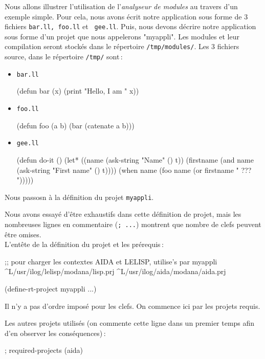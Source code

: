 
Nous allons illustrer l'utilisation de l'{\it analyseur de modules} au
travers d'un exemple simple. Pour cela, nous avons \'{e}crit notre
application sous forme de 3 fichiers {\tt bar.ll, foo.ll} et {\tt
gee.ll}. Puis, nous devons d\'{e}crire notre application sous forme d'un
projet que nous appelerons "myappli". Les modules et leur
compilation seront stock\'{e}s dans le
r\'{e}pertoire {\tt /tmp/modules/}.
Les 3 fichiers source, dans le r\'{e}pertoire {\tt /tmp/} sont\,:
\begin{itemize}
\item {\tt bar.ll}
\begin{Code*}
(defun bar (x) 
  (print "Hello, I am " x))
\end{Code*}
\item {\tt foo.ll}
\begin{Code*}
(defun foo (a b)
   (bar (catenate a b)))
\end{Code*}
\item {\tt gee.ll}
\begin{Code*}
(defun do-it ()
   (let* ((name (ask-string "Name" () t))
          (firstname (and name (ask-string "First name" () t))))
     (when name
           (foo name (or firstname " ??? ")))))
\end{Code*}
\end{itemize}
Nous passosn \`{a} la d\'{e}finition du projet {\tt myappli}. 

Nous avons essay\'{e} d'\^{e}tre
exhaustifs dans cette d\'{e}finition de projet, mais les nombreuses lignes
en commentaire ({\tt ; ...}) montrent que nombre de clefs peuvent
\^{e}tre omises. \\
L'ent\^{e}te de la d\'{e}finition du projet et les pr\'{e}requis\,:
\begin{Code*}
;; pour charger les contextes AIDA et LELISP, utilise's par myappli
^L/usr/ilog/lelisp/modana/lisp.prj
^L/usr/ilog/aida/modana/aida.prj

(define-rt-project myappli ...)
\end{Code*}

Il n'y a pas d'ordre impos\'{e} pour les clefs. On commence ici par les
projets requis.

Les autres projets utilis\'{e}s (on commente cette ligne dans un premier
temps afin d'en observer les cons\'{e}quences)\,:
\begin{Code*}
        ; required-projects (aida)
\end{Code*}

